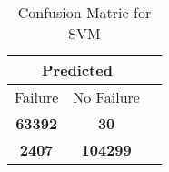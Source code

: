 \begin{table}[] 
\caption{Confusion Matric for SVM} 
\label{Table: Prediction Accuracy-LOFSVM100.0EKF-ignoresolarPanelDipole-solarPanelDipole} 
\centering 
\begin{tabular} 
 {@{}ccc@{}} 
\toprule 
\multicolumn{2}{c}{\textbf{Predicted}}
 \\ \midrule 
\multicolumn{1}{|c|}{Failure} & 
\multicolumn{1}{c|}{No Failure}
 \\ \midrule 
\multicolumn{1}{|c|}{\color{green}\textbf{63392}} & 
\multicolumn{1}{c|}{\color{red}\textbf{30}}
 \\ \midrule 
\multicolumn{1}{|c|}{\color{red}\textbf{2407}} & 
\multicolumn{1}{c|}{\color{green}\textbf{104299}}
 \\ \bottomrule 
\end{tabular} 
\end{table} 
